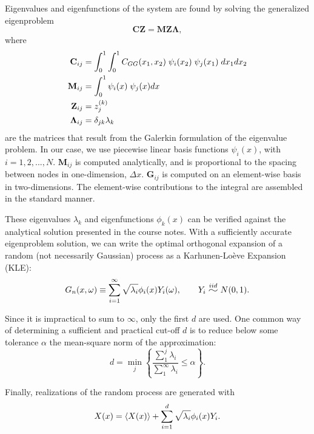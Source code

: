 \documentclass[11pt]{article}
\begin{document}
Eigenvalues and eigenfunctions of the system are found by solving the generalized eigenproblem
\begin{equation}
\mathbf{C Z} = \mathbf{M Z \Lambda},
\end{equation}
where
\begin{equation}
\begin{aligned}
\mathbf{C}_{ij} &= \int_0^1 \int_0^1 C_{GG}(x_1,x_2) \; \psi_i(x_2) \; \psi_j(x_1) \; dx_1 dx_2 \\
\mathbf{M}_{ij} &= \int_0^1 \psi_i(x) \; \psi_j(x) dx \\
\mathbf{Z}_{ij} &= z_j^{(k)} \\
\mathbf{\Lambda}_{ij} &= \delta_{jk} \lambda_k
\end{aligned}
\vspace{1ex}
\end{equation}
are the matrices that result from the Galerkin formulation of the eigenvalue problem. In our case, we use piecewise linear basis functions $\psi_i(x)$, with $i = 1, 2, ..., N$. $\mathbf{M}_{ij}$ is computed analytically, and is proportional to the spacing between nodes in one-dimension, $\Delta x$. $\mathbf{G}_{ij}$ is computed on an element-wise basis in two-dimensions. The element-wise contributions to the integral are assembled in the standard manner.

These eigenvalues $\lambda_k$ and eigenfunctions $\phi_k(x)$ can be verified against the analytical solution presented in the course notes. With a sufficiently accurate eigenproblem solution, we can write the optimal orthogonal expansion of a random (not necessarily Gaussian) process as a Karhunen-Lo\`eve Expansion (KLE):
\begin{equation}
G_n(x,\omega) \equiv \sum_{i=1}^\infty \sqrt{\lambda_i} \phi_i(x) Y_i(\omega), \qquad
Y_i \widesim{iid} N(0,1).
\end{equation}

Since it is impractical to sum to $\infty$, only the first $d$ are used. One common way of determining a sufficient and practical cut-off $d$ is to reduce below some tolerance $\alpha$ the mean-square norm of the approximation:
\begin{equation}
d = \min_j \left\{ \frac{\sum_1^j \lambda_i}{\sum_1^\infty \lambda_i} \le \alpha \right\}
.
\label{eq:MSE_criterion}
\end{equation}

Finally, realizations of the random process are generated with
\begin{equation}
X(x) = \left\langle X(x) \right\rangle + \sum_{i=1}^d \sqrt{\lambda_i} \phi_i(x) Y_i
.
\end{equation}
\end{document}
